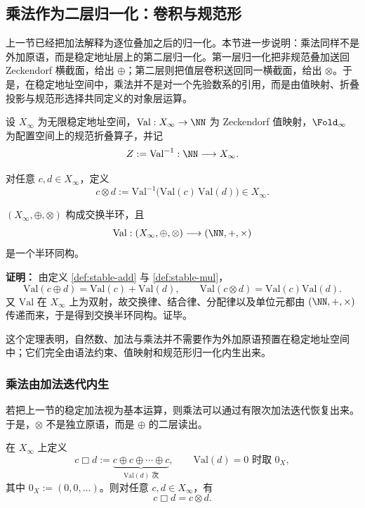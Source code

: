 \subsection{乘法作为二层归一化：卷积与规范形}\label{subsec:emergent-arithmetic-stable-mul}

上一节已经把加法解释为逐位叠加之后的归一化。本节进一步说明：乘法同样不是外加原语，而是稳定地址层上的第二层归一化。第一层归一化把非规范叠加送回 Zeckendorf 横截面，给出 \(\oplus\)；第二层则把值层卷积送回同一横截面，给出 \(\otimes\)。于是，在稳定地址空间中，乘法并不是对一个先验数系的引用，而是由值映射、折叠投影与规范形选择共同定义的对象层运算。

设 \(X_\infty\) 为无限稳定地址空间，\(\mathrm{Val}:X_\infty\to\NN\) 为 Zeckendorf 值映射，\(\Fold_\infty\) 为配置空间上的规范折叠算子，并记
\[
Z:=\mathrm{Val}^{-1}: \NN\longrightarrow X_\infty.
\]

\begin{definition}[稳定乘法]\label{def:stable-mul}
对任意 \(c,d\in X_\infty\)，定义
\[
c\otimes d:=\mathrm{Val}^{-1}\!\bigl(\mathrm{Val}(c)\,\mathrm{Val}(d)\bigr)\in X_\infty.
\]
\end{definition}

\begin{theorem}[乘法的定义性同构]\label{thm:mul-definitional}
\((X_\infty,\oplus,\otimes)\) 构成交换半环，且
\[
\mathrm{Val}:(X_\infty,\oplus,\otimes)\longrightarrow (\NN,+,\times)
\]
是一个半环同构。
\end{theorem}

\textbf{证明：}
由定义 \ref{def:stable-add} 与 \ref{def:stable-mul}，
\[
\mathrm{Val}(c\oplus d)=\mathrm{Val}(c)+\mathrm{Val}(d),\qquad
\mathrm{Val}(c\otimes d)=\mathrm{Val}(c)\mathrm{Val}(d).
\]
又 \(\mathrm{Val}\) 在 \(X_\infty\) 上为双射，故交换律、结合律、分配律以及单位元都由 \((\NN,+,\times)\) 传递而来，于是得到交换半环同构。证毕。

这个定理表明，自然数、加法与乘法并不需要作为外加原语预置在稳定地址空间中；它们完全由语法约束、值映射和规范形归一化内生出来。

\subsubsection{乘法由加法迭代内生}\label{subsec:mul-as-iterated-add}
若把上一节的稳定加法视为基本运算，则乘法可以通过有限次加法迭代恢复出来。于是，\(\otimes\) 不是独立原语，而是 \(\oplus\) 的二层读出。

\begin{theorem}[乘法可由加法与迭代内生]\label{thm:mul-by-iterated-add}
在 \(X_\infty\) 上定义
\[
c\mathbin{\Box} d
:=
\underbrace{c\oplus c\oplus\cdots\oplus c}_{\mathrm{Val}(d)\text{ 次}},
\qquad
\mathrm{Val}(d)=0\text{ 时取 }0_X,
\]
其中 \(0_X:=(0,0,\dots)\)。则对任意 \(c,d\in X_\infty\)，有
\[
c\mathbin{\Box} d=c\otimes d.
\]
\end{theorem}

